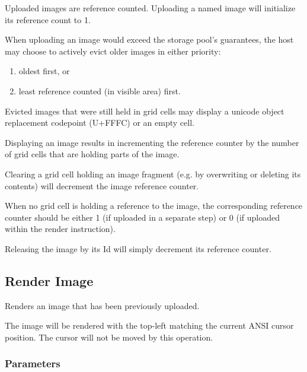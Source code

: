 \documentclass{article}
\begin{document}
Uploaded images are reference counted. Uploading a named image will initialize its reference count to 1.

When uploading an image would exceed the storage pool's guarantees,
the host may choose to actively evict older images in either priority:

\begin{enumerate}
    \item oldest first, or
    \item least reference counted (in visible area) first.
\end{enumerate}

Evicted images that were still held in grid cells may display a unicode object replacement
codepoint (U+FFFC) or an empty cell.

Displaying an image results in incrementing the reference counter by the number of grid cells
that are holding parts of the image.

Clearing a grid cell holding an image fragment (e.g. by overwriting or deleting its contents)
will decrement the image reference counter.

When no grid cell is holding a reference to the image,
the corresponding reference counter should be either 1 (if uploaded in a separate step)
or 0 (if uploaded within the render instruction).

Releasing the image by its Id will simply decrement its reference counter.

\subsection{Render Image}

Renders an image that has been previously uploaded.

The image will be rendered with the top-left matching the current ANSI cursor position.
The cursor will not be moved by this operation.

\subsubsection*{Parameters}
\end{document}
